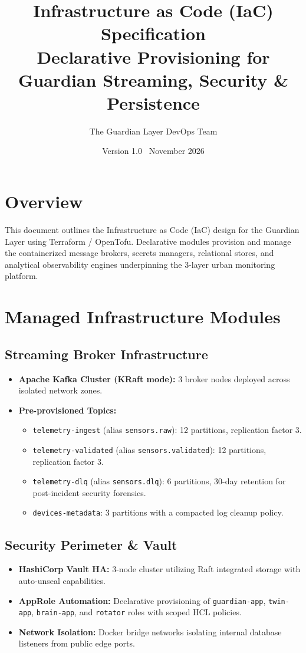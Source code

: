 \documentclass[11pt,a4paper]{article}
\title{\sffamily\bfseries\huge Infrastructure as Code (IaC) Specification\\[0.3em]
\Large Declarative Provisioning for Guardian Streaming, Security \& Persistence}
\author{\textsf{The Guardian Layer DevOps Team}}
\date{\textsf{Version 1.0 \textbar\ November 2026}}
\begin{document}
\maketitle
\thispagestyle{fancy}

\section{Overview}
This document outlines the Infrastructure as Code (IaC) design for the Guardian Layer using Terraform / OpenTofu. Declarative modules provision and manage the containerized message brokers, secrets managers, relational stores, and analytical observability engines underpinning the 3-layer urban monitoring platform.

\section{Managed Infrastructure Modules}

\subsection{Streaming Broker Infrastructure}
\begin{itemize}[leftmargin=*,itemsep=2pt]
  \item \textbf{Apache Kafka Cluster (KRaft mode):} 3 broker nodes deployed across isolated network zones.
  \item \textbf{Pre-provisioned Topics:}
    \begin{itemize}
      \item \texttt{telemetry-ingest} (alias \texttt{sensors.raw}): 12 partitions, replication factor 3.
      \item \texttt{telemetry-validated} (alias \texttt{sensors.validated}): 12 partitions, replication factor 3.
      \item \texttt{telemetry-dlq} (alias \texttt{sensors.dlq}): 6 partitions, 30-day retention for post-incident security forensics.
      \item \texttt{devices-metadata}: 3 partitions with a compacted log cleanup policy.
    \end{itemize}
\end{itemize}

\subsection{Security Perimeter \& Vault}
\begin{itemize}[leftmargin=*,itemsep=2pt]
  \item \textbf{HashiCorp Vault HA:} 3-node cluster utilizing Raft integrated storage with auto-unseal capabilities.
  \item \textbf{AppRole Automation:} Declarative provisioning of \texttt{guardian-app}, \texttt{twin-app}, \texttt{brain-app}, and \texttt{rotator} roles with scoped HCL policies.
  \item \textbf{Network Isolation:} Docker bridge networks isolating internal database listeners from public edge ports.
\end{itemize}
\end{document}
